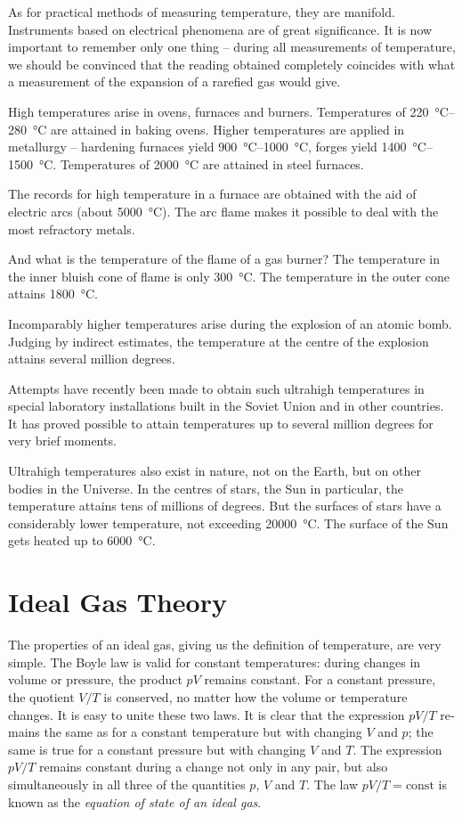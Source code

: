 As for practical methods of measuring temperature, they are manifold. Instruments based on electrical phenomena are of great significance. It is now important to remember only one thing -- during all measurements of temperature, we should be convinced that the reading obtained completely coincides with what a measurement of the expansion of a rarefied gas would give.

High temperatures arise in ovens, furnaces and burners. Temperatures of \SIrange{220}{280}{\celsius} are attained in baking ovens. Higher temperatures are applied in metallurgy -- hardening furnaces yield \SIrange{900}{1000}{\celsius}, forges yield \SIrange{1400}{1500}{\celsius}. Temperatures of \SI{2000}{\celsius} are attained in steel furnaces.

The records for high temperature in a furnace are ob­tained with the aid of electric arcs (about \SI{5000}{\celsius}). The arc flame makes it possible to deal with the most refractory metals.

And what is the temperature of the flame of a gas burn­er? The temperature in the inner bluish cone of flame is only \SI{300}{\celsius}. The temperature in the outer cone attains \SI{1800}{\celsius}.

Incomparably higher temperatures arise during the explosion of an atomic bomb. Judging by indirect esti­mates, the temperature at the centre of the explosion attains several million degrees.

Attempts have recently been made to obtain such ultrahigh temperatures in special laboratory installations built in the Soviet Union and in other countries. It has proved possible to attain temperatures up to several million degrees for very brief moments.

Ultrahigh temperatures also exist in nature, not on the Earth, but on other bodies in the Universe. In the centres of stars, the Sun in particular, the temperature attains tens of millions of degrees. But the surfaces of stars have a considerably lower temperature, not exceeding \SI{20000}{\celsius}. The surface of the Sun gets heated up to \SI{6000}{\celsius}.

\section{Ideal Gas Theory}
The properties of an ideal gas, giving us the definition of temperature, are very simple. The Boyle law is valid for constant temperatures: during changes in volume or pres­sure, the product $pV$ remains constant. For a constant pressure, the quotient $V/T$ is conserved, no matter how the volume or temperature changes. It is easy to unite these two laws. It is clear that the expression $pV/T$ re­mains the same as for a constant temperature but with changing $V$ and $p$; the same is true for a constant pressure but with changing $V$ and $T$. The expression $pV/T$ re­mains constant during a change not only in any pair, but also simultaneously in all three of the quantities $p$, $V$ and $T$. The law $pV/T = \text{const}$ is known as the \emph{equation of state of an ideal gas}.

